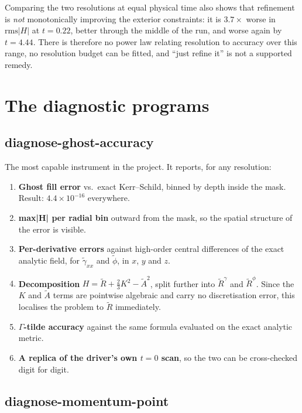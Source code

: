 \documentclass[11pt,openany]{book}
\newcommand{\ph}{\tilde{\phi}}
\newcommand{\At}{\tilde{A}}
\newcommand{\etr}{\tilde{\gamma}}
\begin{document}
Comparing the two resolutions at equal physical time also shows that refinement
is \emph{not} monotonically improving the exterior constraints: it is $3.7\times$
worse in $\mathrm{rms}|H|$ at $t = 0.22$, better through the middle of the run,
and worse again by $t = 4.44$. There is therefore no power law relating
resolution to accuracy over this range, no resolution budget can be fitted, and
``just refine it'' is not a supported remedy.

\section{The diagnostic programs}

\subsection{diagnose-ghost-accuracy}

The most capable instrument in the project. It reports, for any resolution:

\begin{enumerate}
\item \textbf{Ghost fill error} vs.\ exact Kerr--Schild, binned by depth inside
      the mask. Result: $4.4\times10^{-16}$ everywhere.
\item \textbf{max|H| per radial bin} outward from the mask, so the spatial
      structure of the error is visible.
\item \textbf{Per-derivative errors} against high-order central differences of
      the exact analytic field, for $\etr_{xx}$ and $\ph$, in $x$, $y$ and $z$.
\item \textbf{Decomposition} $H = \tilde{R} + \tfrac23 K^2 - \At^2$, split
      further into $\tilde{R}^\gamma$ and $\tilde{R}^\phi$. Since the $K$ and
      $\At$ terms are pointwise algebraic and carry no discretisation error,
      this localises the problem to $\tilde{R}$ immediately.
\item \textbf{$\Gamma$-tilde accuracy} against the same formula evaluated on
      the exact analytic metric.
\item \textbf{A replica of the driver's own $t=0$ scan}, so the two can be
      cross-checked digit for digit.
\end{enumerate}

\subsection{diagnose-momentum-point}
\end{document}
